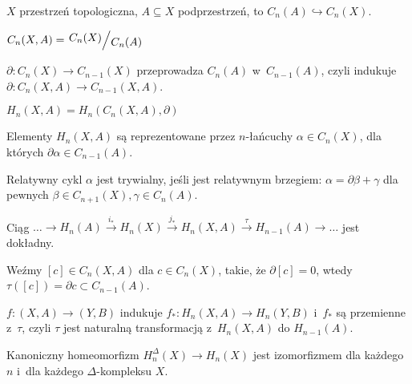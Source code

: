 

 


$X$ przestrzeń topologiczna, $A \subseteq X$ podprzestrzeń,
to $C_n(A) \hookrightarrow C_n(X)$.

\begin{definicja}
	$C_n(X, A) = \bigslant{C_n(X)}{C_n(A)}$
\end{definicja}

\begin{definicja}
	$\partial:C_n(X) \to C_{n-1}(X)$
	przeprowadza $C_n(A)$ w~$C_{n-1}(A)$,
	czyli indukuje $\partial: C_n(X, A) \to C_{n-1}(X, A)$.
\end{definicja}

\begin{definicja}
	$H_n(X, A) = H_n( C_n(X, A), \partial)$
\end{definicja}

\begin{wniosek}
	Elementy $H_n(X, A)$ są reprezentowane przez $n$-łańcuchy
	$\alpha \in C_n(X)$, dla których $\partial \alpha \in C_{n-1}(A)$.
\end{wniosek}

\begin{wniosek}
	Relatywny cykl $\alpha$ jest trywialny, jeśli jest relatywnym
	brzegiem: $\alpha = \partial \beta + \gamma$
	dla pewnych $\beta \in C_{n+1}(X), \gamma \in C_n(A)$.
\end{wniosek}

\begin{twierdzenie}
	Ciąg $\ldots \to H_n(A) 
	\xrightarrow{i_\ast} H_n(X) 
	\xrightarrow{j_\ast} H_n(X, A)
	\xrightarrow{\tau} H_{n-1}(A) \to \ldots$
	jest dokładny.
	
	Weźmy $[c] \in C_n(X, A)$ dla $c \in C_n(X)$, takie, że
	$\partial [c] = 0$,
	wtedy $\tau([c]) = \partial c \subset C_{n-1}(A)$.
\end{twierdzenie}

\begin{twierdzenie}
	$f:(X, A) \to (Y, B)$ indukuje $f_\ast: H_n(X, A) \to H_n(Y, B)$
	i~$f_\ast$ są przemienne z~$\tau$, czyli
	$\tau$ jest naturalną transformacją z~$H_n(X, A)$ do $H_{n-1}(A)$.
\end{twierdzenie}

\begin{twierdzenie}
	Kanoniczny homeomorfizm $H_n^\Delta(X) \to H_n(X)$ jest
	izomorfizmem dla każdego $n$ i~dla każdego $\Delta$-kompleksu $X$.
\end{twierdzenie}

